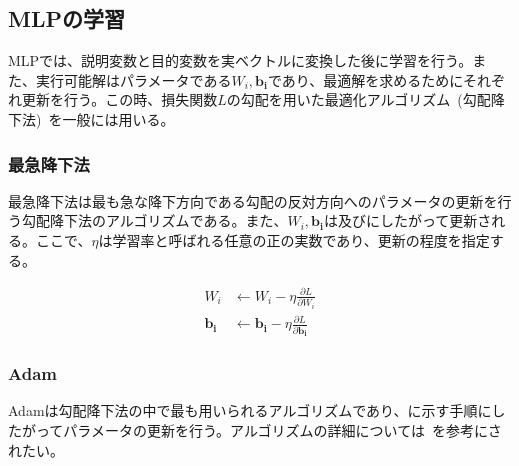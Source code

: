 \clearpage

\subsection{MLPの学習}

MLPでは、説明変数と目的変数を実ベクトルに変換した後に学習を行う。また、実行可能解はパラメータである$W_i,\boldsymbol{b_i}$であり、最適解を求めるためにそれぞれ更新を行う。この時、損失関数$L$の勾配を用いた最適化アルゴリズム~(勾配降下法)~を一般には用いる。

\subsubsection{最急降下法}

最急降下法は最も急な降下方向である勾配の反対方向へのパラメータの更新を行う勾配降下法のアルゴリズムである。また、$W_i,\boldsymbol{b_i}$は及びにしたがって更新される。ここで、$\eta$は学習率と呼ばれる任意の正の実数であり、更新の程度を指定する。

\begin{align}
    \label{eq:MLP2_0}
    W _i &\leftarrow W_i - \eta \frac{\partial L}{\partial W_i} \\
    \label{eq:MLP2_1}
    \boldsymbol{b _i} &\leftarrow \boldsymbol{b_i} - \eta \frac{\partial L}{\partial \boldsymbol{b_i}}
\end{align}

\subsubsection{Adam}
\label{sec:Adam}

Adamは勾配降下法の中で最も用いられるアルゴリズムであり、に示す手順にしたがってパラメータの更新を行う。アルゴリズムの詳細については~\cite{Adam}を参考にされたい。

